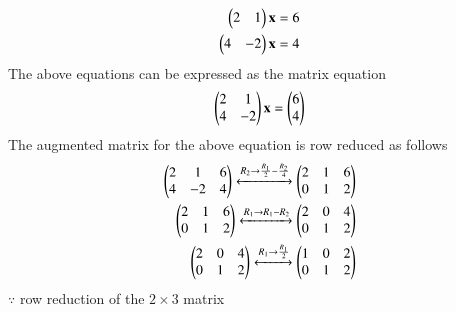 
%
\item
\begin{align}
\begin{split}
\begin{pmatrix}2 & 1 \end{pmatrix}\mathbf{x}&=6
\\
\begin{pmatrix}4 & -2 \end{pmatrix}\mathbf{x}&=4
\end{split}
\end{align}
The above equations can be expressed as the matrix equation
\begin{align}
\begin{pmatrix}2 & 1\\4 & -2\end{pmatrix} \mathbf{x} = \begin{pmatrix}6\\4\end{pmatrix}
\end{align}
%
The augmented matrix for the above equation is row reduced as follows
\begin{align}
\begin{pmatrix}2 & 1 & 6\\4 & -2 & 4\end{pmatrix} 
\xleftrightarrow{R_2\rightarrow \frac{R_1}{2}-\frac{R_2}{4}}
\begin{pmatrix}2 & 1 & 6\\0 & 1 & 2\end{pmatrix}
\\
\begin{pmatrix}2 & 1 & 6\\0 & 1 & 2\end{pmatrix}
\xleftrightarrow{R_1\rightarrow R_1-R_2}
\begin{pmatrix}2 & 0 & 4\\ 0 & 1 & 2\end{pmatrix}
\\
\begin{pmatrix}2 & 0 & 4\\0 & 1 & 2\end{pmatrix}
\xleftrightarrow{R_1\rightarrow\frac{R_1}{2}}
\begin{pmatrix}1 & 0 & 2\\0 & 1 & 2\end{pmatrix}
\end{align}
%
$\because$ row reduction of the $2\times 3$ matrix
